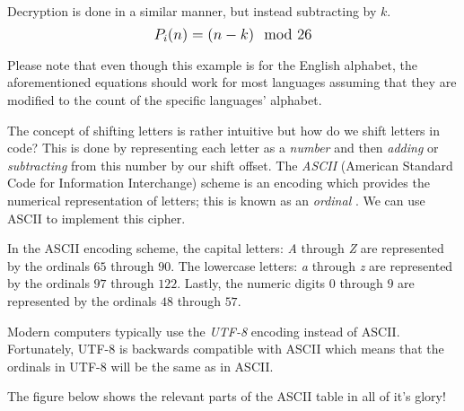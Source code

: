 Decryption is done in a similar manner, but instead subtracting by $k$. $$\mathlarger{P_i(n)=(n-k)\mod{26}}$$

Please note that even though this example is for the English alphabet, the aforementioned equations should work for most languages assuming that they are modified
to the count of the specific languages' alphabet.

The concept of shifting letters is rather intuitive but how do we shift letters in code? This is done by representing
each letter as a \textit{number} and then \textit{adding} or \textit{subtracting} from this number by our shift
offset. The \textit{ASCII} (American Standard Code for Information Interchange) scheme is an encoding which 
provides the numerical representation of letters; this is known as an \textit{ordinal} \cite{caesar_cipher_invent_with_python}. 
We can use ASCII to implement this cipher. 

In the ASCII encoding scheme, the capital letters: \textit{A} through \textit{Z} are represented by the ordinals $65$ through 
$90$. The lowercase letters: \textit{a} through \textit{z} are represented by the ordinals $97$ through $122$. 
Lastly, the numeric digits $0$ through $9$ are represented by the ordinals $48$ through $57$.

Modern computers typically use the \textit{UTF-8} encoding instead of ASCII. Fortunately, UTF-8 is backwards compatible
with ASCII which means that the ordinals in UTF-8 will be the same as in ASCII.

The figure below shows the relevant parts of the ASCII table in all of it's glory!

